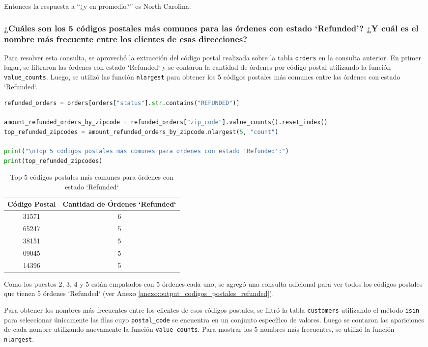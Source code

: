 Entonces la respuesta a ``¿y en promedio?'' es North Carolina.

\subsubsection{¿Cuáles son los 5 códigos postales más comunes para las órdenes con estado `Refunded'? ¿Y cuál es el nombre más frecuente entre los clientes de esas direcciones?}

Para resolver esta consulta, se aprovechó la extracción del código postal realizada sobre la tabla \texttt{orders} en la consulta anterior. 
En primer lugar, se filtraron las órdenes con estado `Refunded` y se contaron la cantidad de órdenes por código postal utilizando la función \texttt{value\_counts}. Luego, se utilizó las función \texttt{nlargest} para obtener los 5 códigos postales más comunes entre las órdenes con estado `Refunded`.

\begin{lstlisting}[language=Python, xleftmargin=35pt, xrightmargin=35pt]
refunded_orders = orders[orders["status"].str.contains("REFUNDED")]

amount_refunded_orders_by_zipcode = refunded_orders["zip_code"].value_counts().reset_index()
top_refunded_zipcodes = amount_refunded_orders_by_zipcode.nlargest(5, "count")

print("\nTop 5 codigos postales mas comunes para ordenes con estado 'Refunded':")
print(top_refunded_zipcodes)
\end{lstlisting}
\begin{table}[H]
\centering
\begin{tabular}{|c|c|}
\hline
\textbf{Código Postal} & \textbf{Cantidad de Órdenes `Refunded`} \\
\hline
31571 & 6 \\
65247 & 5 \\
38151 & 5 \\
09045 & 5 \\
14396 & 5 \\
\hline
\end{tabular}
\caption{Top 5 códigos postales más comunes para órdenes con estado `Refunded`}
\end{table}
Como los puestos 2, 3, 4 y 5 están empatados con 5 órdenes cada uno, se agregó una consulta adicional para ver todos los códigos postales que tienen 5 órdenes `Refunded` (ver Anexo \ref{anexo:output_codigos_postales_refunded}).

Para obtener los nombres más frecuentes entre los clientes de esos códigos postales, se filtró la tabla \texttt{customers} utilizando el método \texttt{isin} para seleccionar únicamente las filas cuyo \texttt{postal\_code} se encuentra en un conjunto específico de valores. Luego se contaron las apariciones de cada nombre utilizando nuevamente la función \texttt{value\_counts}. Para mostrar los 5 nombres más frecuentes, se utilizó la función \texttt{nlargest}.

